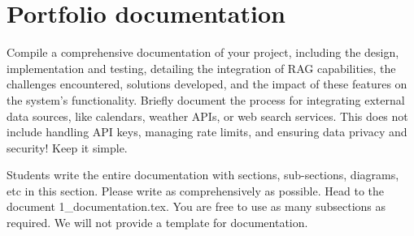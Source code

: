 \setcounter{page}{1}
\section{Portfolio documentation}
\label{sec:documentation}

Compile a comprehensive documentation of your project, including the design, implementation and testing, detailing the integration of RAG capabilities, the challenges encountered, solutions developed, and the impact of these features on the system's functionality. 
Briefly document the process for integrating external data sources, like calendars, weather APIs, or web search services. This does not include handling API keys, managing rate limits, and ensuring data privacy and security! Keep it simple.

Students write the entire documentation with sections, sub-sections, diagrams, etc in this section. Please write as comprehensively as possible. Head to the document 1\_documentation.tex. You are free to use as many subsections as required. We will not provide a template for documentation. 